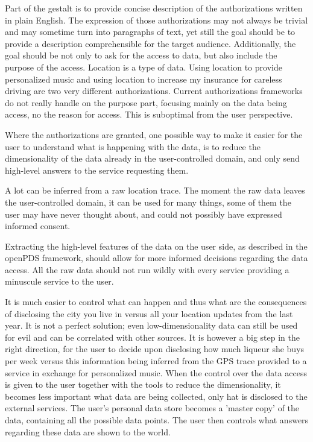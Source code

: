 Part of the gestalt is to provide concise description of the authorizations written in plain English.
The expression of those authorizations may not always be trivial and may sometime turn into paragraphs of text, yet still the goal should be to provide a description comprehensible for the target audience.
Additionally, the goal should be not only to ask for the access to data, but also include the purpose of the access.
Location is a type of data.
Using location to provide personalized music and using location to increase my insurance for careless driving are two very different authorizations.
Current authorizations frameworks do not really handle on the purpose part, focusing mainly on the data being access, no the reason for access.
This is suboptimal from the user perspective.

Where the authorizations are granted, one possible way to make it easier for the user to understand what is happening with the data, is to reduce the dimensionality of the data already in the user-controlled domain, and only send high-level answers to the service requesting them.

A lot can be inferred from a raw location trace.
The moment the raw data leaves the user-controlled domain, it can be used for many things, some of them the user may have never thought about, and could not possibly have expressed informed consent.

Extracting the high-level features of the data on the user side, as described in the openPDS framework, should allow for more informed decisions regarding the data access.
All the raw data should not run wildly with every service providing a minuscule service to the user.

It is much easier to control what can happen and thus what are the consequences of disclosing the city you live in versus all your location updates from the last year.
It is not a perfect solution; even low-dimensionality data can still be used for evil and can be correlated with other sources.
It is however a big step in the right direction, for the user to decide upon disclosing how much liqueur she buys per week versus this information being inferred from the GPS trace provided to a service in exchange for personalized music.
When the control over the data access is given to the user together with the tools to reduce the dimensionality, it becomes less important what data are being collected, only hat is disclosed to the external services.
The user's personal data store becomes a 'master copy' of the data, containing all the possible data points.
The user then controls what answers regarding these data are shown to the world.

